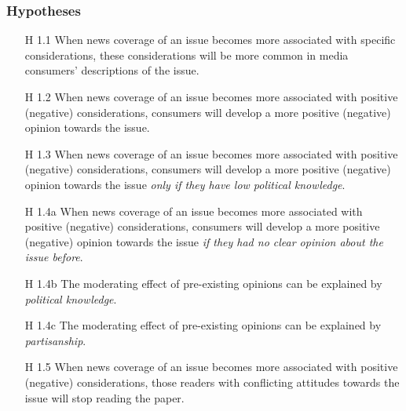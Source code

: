 \documentclass{article}
\begin{document}

\subsubsection{Hypotheses}

\begin{enumerate}
    \item[H 1.1]{When news coverage of an issue becomes more associated with specific considerations, these considerations will be more common in media consumers' descriptions of the issue.}
    \item[H 1.2]{When news coverage of an issue becomes more associated with positive (negative) considerations, consumers will develop a more positive (negative) opinion towards the issue.}
    \item[H 1.3]{When news coverage of an issue becomes more associated with  positive (negative) considerations, consumers will develop a more positive (negative) opinion towards the issue \textit{only if they have low political knowledge}.}
    \item[H 1.4a]{When news coverage of an issue becomes more associated with positive (negative) considerations, consumers will develop a more positive (negative) opinion towards the issue \textit{if they had no clear opinion about the issue before}.}
    \item[H 1.4b]{The moderating effect of pre-existing opinions can be explained by \textit{political knowledge}.}
    \item[H 1.4c]{The moderating effect of pre-existing opinions can be explained by \textit{partisanship}.}
    \item[H 1.5]{When news coverage of an issue becomes more associated with positive (negative) considerations, those readers with conflicting attitudes towards the issue will stop reading the paper.}
\end{enumerate}
\end{document}
